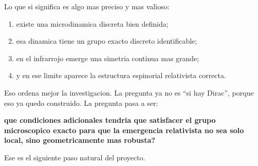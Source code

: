 Lo que si significa es algo mas preciso y mas valioso:
\begin{enumerate}[label=\arabic*.]
    \item existe una microdinamica discreta bien definida;
    \item esa dinamica tiene un grupo exacto discreto identificable;
    \item en el infrarrojo emerge una simetria continua mas grande;
    \item y en ese limite aparece la estructura espinorial relativista correcta.
\end{enumerate}

Eso ordena mejor la investigacion. La pregunta ya no es \enquote{si hay Dirac}, porque eso ya quedo construido. La pregunta pasa a ser:
\begin{displayquote}
\textbf{que condiciones adicionales tendria que satisfacer el grupo microscopico exacto para que la emergencia relativista no sea solo local, sino geometricamente mas robusta?}
\end{displayquote}

Ese es el siguiente paso natural del proyecto.
